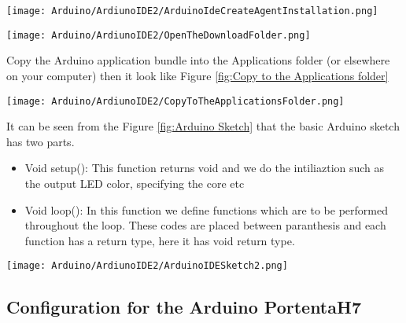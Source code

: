 \begin{center}
    
    \texttt{[image: Arduino/ArdiunoIDE2/ArduinoIdeCreateAgentInstallation.png]}
    \label{fig:ArduinoIDE Create Agent Installation}
\end{center}

\begin{center}
    \texttt{[image: Arduino/ArdiunoIDE2/OpenTheDownloadFolder.png]}
\end{center}

Copy the Arduino application bundle into the Applications folder (or elsewhere on your computer) then it look like Figure \ref{fig:Copy to the Applications folder}

\begin{center}
    
    \texttt{[image: Arduino/ArdiunoIDE2/CopyToTheApplicationsFolder.png]}
    \label{fig:Copy to the Applications folder}
\end{center}

It can be seen from the Figure \ref{fig:Arduino Sketch} that the basic Arduino sketch has two parts. 

\begin{itemize}
    \item Void setup(): This function returns void and we do the intiliaztion such as the output LED color, specifying the core etc
    \item Void loop(): In this function we define functions which are to be performed throughout the loop. These codes are placed between paranthesis {} and each function has a return type, here it has void return type.
\end{itemize}

\begin{center}
    \label{fig:Arduino Sketch}
    \texttt{[image: Arduino/ArdiunoIDE2/ArduinoIDESketch2.png]}
\end{center}


\subsection{Configuration for the Arduino PortentaH7}

